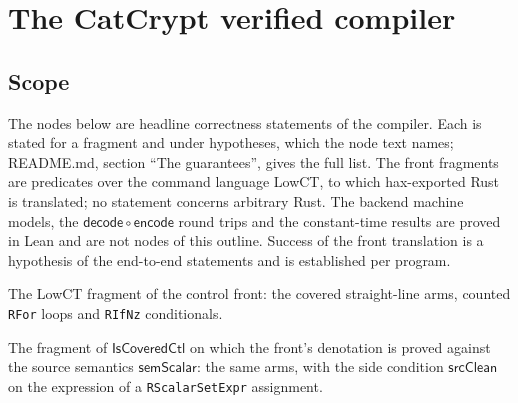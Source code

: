 
\chapter{The CatCrypt verified compiler}

\section{Scope}

The nodes below are headline correctness statements of the compiler. Each is stated
for a fragment and under hypotheses, which the node text names; README.md, section
``The guarantees'', gives the full list. The front fragments are predicates over the
command language LowCT, to which hax-exported Rust is translated; no statement
concerns arbitrary Rust. The backend machine models, the
$\mathsf{decode}\circ\mathsf{encode}$ round trips and the constant-time results are
proved in Lean and are not nodes of this outline. Success of the front translation
is a hypothesis of the end-to-end statements and is established per program.

\begin{definition}
  \label{def:covered-ctl}
  \leanok
  The LowCT fragment of the control front: the covered straight-line arms, counted
  \texttt{RFor} loops and \texttt{RIfNz} conditionals.
\end{definition}

\begin{definition}
  \label{def:covered-sctl}
  \leanok
  The fragment of $\mathsf{IsCoveredCtl}$ on which the front's denotation is proved
  against the source semantics $\mathsf{semScalar}$: the same arms, with the side
  condition $\mathsf{srcClean}$ on the expression of a \texttt{RScalarSetExpr}
  assignment.
\end{definition}

